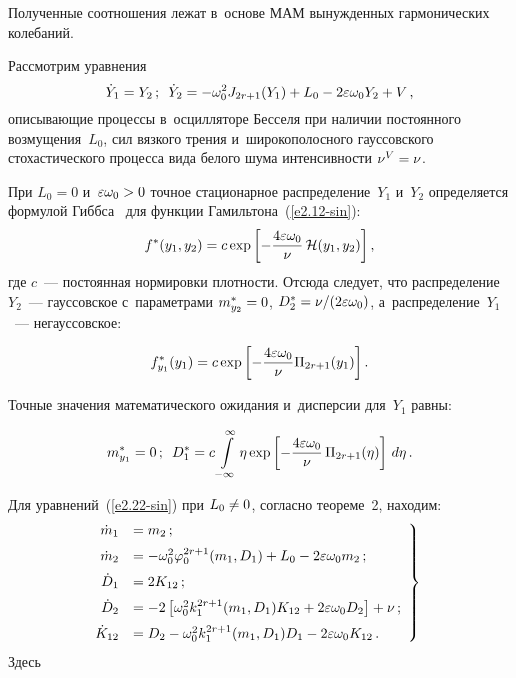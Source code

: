 \begin{multicols}{2}
{Полученные соотношения лежат в~основе МАМ вынужденных гармонических колебаний.

Рассмотрим уравнения
\begin{equation}
\dot Y_1 = Y_2\,;\enskip 
\dot Y_2 = -\omega_0^2 J_{2r+1} (Y_1)+ L_0 - 2\varepsilon \omega_0 Y_2 +V\,,
\label{e2.23-sin}
\end{equation}
описывающие процессы в~осцилляторе Бесселя при наличии постоянного возмущения~$L_0$,
сил вязкого трения и~широкополосного гауссовского стохастического процесса вида  
белого шума интенсивности $\nu^V\hm=\nu$.

При $L_0=0$ и~$\varepsilon \omega_0\hm >0$ точное стационарное распределение~$Y_1$ 
и~$Y_2$ определяется формулой Гиббса~\cite{9-sin, 10-sin} для функции 
Гамильтона~(\ref{e2.12-sin}):
\begin{equation*}
f^* (y_1, y_2) =c \exp \lk - \fr{4\varepsilon\omega_0}{\nu}\,\mathcal{H} 
(y_1, y_2)\rk, %
\end{equation*}
где $c$~--- постоянная нормировки плотности.
Отсюда следует, что распределение~$Y_2$~--- гауссовское 
с~параметрами $m_{y_2}^* \hm=0$, $D_2^* \hm= \nu/(2\varepsilon\omega_0)$, 
а~распределение~$Y_1$~---  негауссовское:

\noindent
    \begin{equation*}
    f_{y_1}^* (y_1) = c \exp \left[ - \displaystyle\frac{\displaystyle 4\varepsilon \omega_0\mathstrut}{\displaystyle \nu\mathstrut} \Pi_{2r+1} (y_1) \right].
\end{equation*}

Точные значения математического ожидания и~дисперсии для~$Y_1$ равны:

\noindent
\begin{equation*}
m_{y_1}^* =0\,;\enskip D_1^* = c \iin \eta \exp \lk - \fr{4\varepsilon\omega_0}{\nu}\,
\Pi_{2r+1} (\eta) \rk \,d\eta\,. %
\end{equation*}

Для уравнений~(\ref{e2.22-sin}) при  $L_0\hm\ne 0$, согласно теореме~2, находим:
\begin{equation}
\left.
\hspace*{-3mm}\begin{array}{rl}
\dot m_1 &= m_2\,;\\[6pt] 
\dot m_2 &=-\omega_0^2 \vrp_0^{2r+1} (m_1, D_1) + L_0 - 2 \varepsilon \omega_0 m_2\,;
\\[6pt]
\dot D_1 &= 2 K_{12}\,;\\[6pt] 
\dot D_2 &= - 2 \lk \omega_0^2 k_1^{2r+1} (m_1, D_1) K_{12} + 2\varepsilon \omega_0 D_2\rk + \nu\,;
\\[6pt]
\dot K_{12} &= D_2 - \omega_0^2 k_1^{2r+1}(m_1, D_1) D_1 - 2\varepsilon \omega_0 K_{12}\,.
\end{array}
\right\}
\label{e2.27-sin}
\end{equation}
Здесь

}
\end{multicols}
